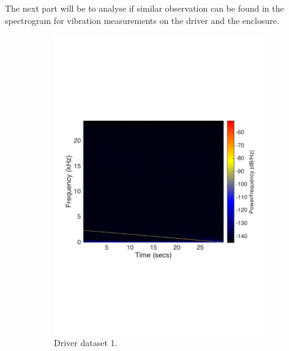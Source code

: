 The next part will be to analyse if similar observation can be found in the spectrogram for vibration measurements on the driver and the enclosure. 

\begin{figure}[H]
\centering
\begin{subfigure}[t]{0.47\textwidth}
	\includegraphics[width=1\textwidth]{figures/spectrogram_driver1.pdf}
	\caption{Driver dataset 1.}
	\label{fig:spectrogram_driver1}
\end{subfigure}
\begin{subfigure}[t]{0.47\textwidth}

\end{subfigure}
\end{figure}

